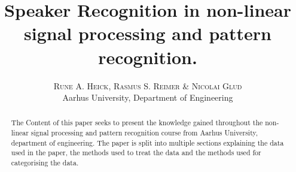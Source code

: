 
\usepackage{amsmath,amsfonts,amssymb}

\title{\vspace{-15mm}\fontsize{24pt}{10pt}\selectfont\textbf{Speaker Recognition in non-linear signal processing and pattern recognition.}} %

\author{
\large
\textsc{Rune A. Heick, Rasmus S. Reimer \& Nicolai Glud}\\[2mm] %
\normalsize Aarhus University, Department of Engineering \\ %
\vspace{-5mm}
}
\date{}




\maketitle %
\thispagestyle{fancy} %


\begin{abstract}
The Content of this paper seeks to present the knowledge gained throughout the non-linear signal processing and pattern recognition course from Aarhus University, department of engineering. The paper is split into multiple sections explaining the data used in the paper, the methods used to treat the data and the methods used for categorising the data.
\end{abstract}







